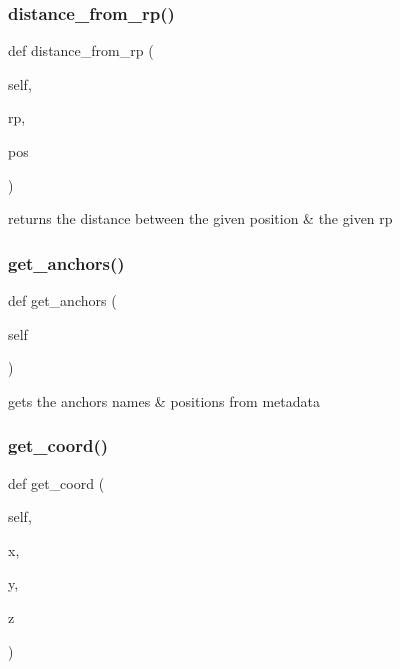 \subsubsection{\texorpdfstring{distance\+\_\+from\+\_\+rp()}{distance\_from\_rp()}}
{\footnotesize\ttfamily def distance\+\_\+from\+\_\+rp (\begin{DoxyParamCaption}\item[{}]{self,  }\item[{}]{rp,  }\item[{}]{pos }\end{DoxyParamCaption})}

\begin{DoxyVerb}returns the distance between the given position & the given rp\end{DoxyVerb}
 \mbox{\label{classread_rangings_1_1_rangings_a9cab236ac56c4f2245c8f87035f736ef}} 
\subsubsection{\texorpdfstring{get\+\_\+anchors()}{get\_anchors()}}
{\footnotesize\ttfamily def get\+\_\+anchors (\begin{DoxyParamCaption}\item[{}]{self }\end{DoxyParamCaption})}

\begin{DoxyVerb}gets the anchors names & positions from metadata\end{DoxyVerb}
 \mbox{\label{classread_rangings_1_1_rangings_aec61a49900a125b0b6f614e94fba7003}} 
\subsubsection{\texorpdfstring{get\+\_\+coord()}{get\_coord()}}
{\footnotesize\ttfamily def get\+\_\+coord (\begin{DoxyParamCaption}\item[{}]{self,  }\item[{}]{x,  }\item[{}]{y,  }\item[{}]{z }\end{DoxyParamCaption})}

